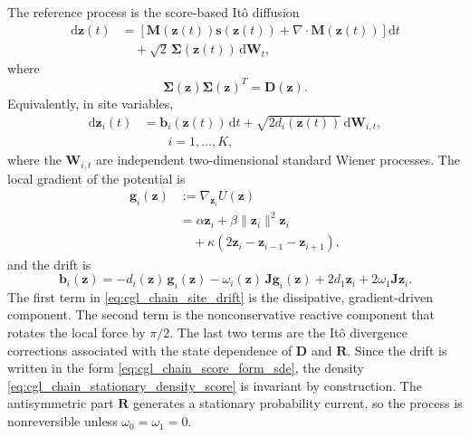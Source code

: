 \documentclass[11pt,twoside,fleqn]{article}
\renewcommand{\d}{\mathrm{d}}
\begin{document}
The reference process is the score-based It\^o diffusion
\begin{align}
    \d\bm{z}(t)
    &=
    \left[
        \bm{M}(\bm{z}(t))\bm{s}(\bm{z}(t))
        +
        \nabla\cdot\bm{M}(\bm{z}(t))
    \right]\d t
    \\
    &\quad+
    \sqrt{2}\,
    \bm{\Sigma}(\bm{z}(t))\,\d\bm{W}_t,
    \label{eq:cgl_chain_score_form_sde}
\end{align}
where
\begin{equation}
    \bm{\Sigma}(\bm{z})\bm{\Sigma}(\bm{z})^T
    =
    \bm{D}(\bm{z}).
    \label{eq:cgl_chain_noise_amplitude}
\end{equation}
Equivalently, in site variables,
\begin{align}
    \d\bm{z}_i(t)
    &=
    \bm{b}_i(\bm{z}(t))\,\d t
    +
    \sqrt{2d_i(\bm{z}(t))}\,\d\bm{W}_{i,t},
    \\
    &\qquad
    i=1,\ldots,K,
    \label{eq:cgl_chain_site_sde}
\end{align}
where the \(\bm{W}_{i,t}\) are independent two-dimensional standard Wiener processes. The local gradient of the potential is
\begin{align}
    \bm{g}_i(\bm{z})
    &:=
    \nabla_{\bm{z}_i}U(\bm{z})
    \\
    &=
    \alpha\bm{z}_i
    +
    \beta\|\bm{z}_i\|^2\bm{z}_i
    \\
    &\quad+
    \kappa
    \left(
        2\bm{z}_i-\bm{z}_{i-1}-\bm{z}_{i+1}
    \right),
    \label{eq:cgl_chain_potential_gradient}
\end{align}
and the drift is
\begin{equation}
    \bm{b}_i(\bm{z})
    =
    -d_i(\bm{z})\,\bm{g}_i(\bm{z})
    -
    \omega_i(\bm{z})\,\bm{J}\bm{g}_i(\bm{z})
    +
    2d_1\bm{z}_i
    +
    2\omega_1\bm{J}\bm{z}_i.
    \label{eq:cgl_chain_site_drift}
\end{equation}
The first term in \eqref{eq:cgl_chain_site_drift} is the dissipative, gradient-driven component. The second term is the nonconservative reactive component that rotates the local force by \(\pi/2\). The last two terms are the It\^o divergence corrections associated with the state dependence of \(\bm{D}\) and \(\bm{R}\). Since the drift is written in the form \eqref{eq:cgl_chain_score_form_sde}, the density \eqref{eq:cgl_chain_stationary_density_score} is invariant by construction. The antisymmetric part \(\bm{R}\) generates a stationary probability current, so the process is nonreversible unless \(\omega_0=\omega_1=0\).
\end{document}
